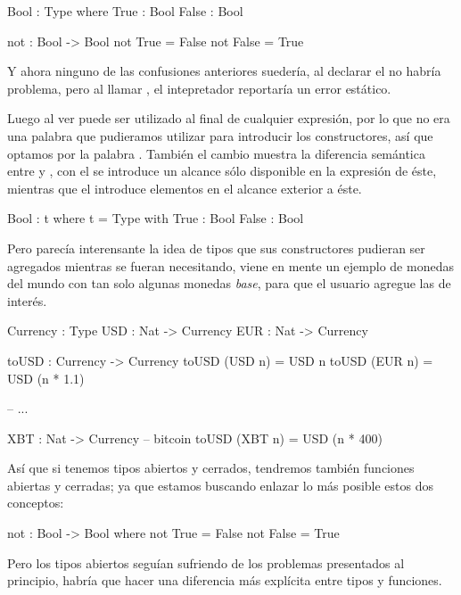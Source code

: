 \begin{designfr}
\begin{anglercode}
Bool : Type where
    True : Bool
    False : Bool

not : Bool -> Bool
not True = False
not False = True
\end{anglercode}

Y ahora ninguno de las confusiones anteriores suedería, al declarar el  no habría problema, pero al llamar , el intepretador reportaría un error estático.

Luego al ver  puede ser utilizado al final de cualquier expresión, por lo que no era una palabra que pudieramos utilizar para introducir los constructores, así que optamos por la palabra . También el cambio muestra la diferencia semántica entre  y , con el  se introduce un alcance sólo disponible en la expresión de éste, mientras que el  introduce elementos en el alcance exterior a éste.

\begin{anglercode}
Bool : t where t = Type
    with
        True : Bool
        False : Bool
\end{anglercode}

Pero parecía interensante la idea de tipos que sus constructores pudieran ser agregados mientras se fueran necesitando, viene en mente un ejemplo de monedas del mundo con tan solo algunas monedas \textit{base}, para que el usuario agregue las de interés.

\begin{anglercode}
Currency : Type
USD : Nat -> Currency
EUR : Nat -> Currency

toUSD : Currency -> Currency
toUSD (USD n) = USD n
toUSD (EUR n) = USD (n * 1.1)

-- ...

XBT : Nat -> Currency   -- bitcoin
toUSD (XBT n) = USD (n * 400)
\end{anglercode}

Así que si tenemos tipos abiertos y cerrados, tendremos también funciones abiertas y cerradas; ya que estamos buscando enlazar lo más posible estos dos conceptos:

\begin{anglercode}
not : Bool -> Bool where
    not True = False
    not False = True
\end{anglercode}

Pero los tipos abiertos seguían sufriendo de los problemas presentados al principio, habría que hacer una diferencia más explícita entre tipos y funciones.


\end{designfr}
